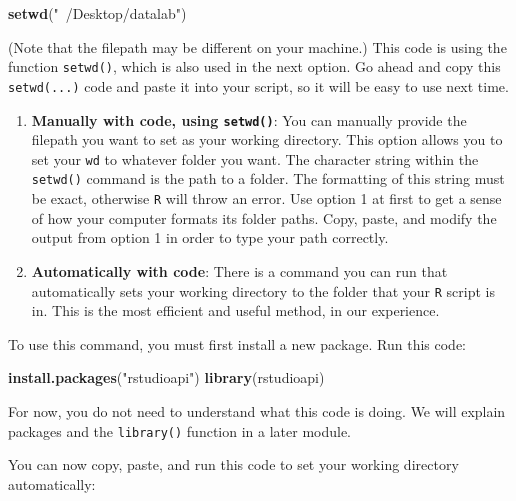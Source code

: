 \documentclass[
]{book}
\newenvironment{Shaded}{\begin{snugshade}}{\end{snugshade}}
\newcommand{\KeywordTok}[1]{\textcolor[rgb]{0.13,0.29,0.53}{\textbf{#1}}}
\newcommand{\NormalTok}[1]{#1}
\newcommand{\OperatorTok}[1]{\textcolor[rgb]{0.81,0.36,0.00}{\textbf{#1}}}
\newcommand{\StringTok}[1]{\textcolor[rgb]{0.31,0.60,0.02}{#1}}
\begin{document}
\begin{Shaded}
\begin{Highlighting}[]
\KeywordTok{setwd}\NormalTok{(}\StringTok{"~/Desktop/datalab"}\NormalTok{)}
\end{Highlighting}
\end{Shaded}

(Note that the filepath may be different on your machine.) This code is using the function \texttt{setwd()}, which is also used in the next option. Go ahead and copy this \texttt{setwd(...)} code and paste it into your script, so it will be easy to use next time.

\begin{enumerate}
\def\labelenumi{\arabic{enumi}.}
\setcounter{enumi}{1}
\item
  \textbf{Manually with code, using \texttt{setwd()}}: You can manually provide the filepath you want to set as your working directory. This option allows you to set your \texttt{wd} to whatever folder you want. The character string within the \texttt{setwd()} command is the path to a folder. The formatting of this string must be exact, otherwise \texttt{R} will throw an error. Use option 1 at first to get a sense of how your computer formats its folder paths. Copy, paste, and modify the output from option 1 in order to type your path correctly.
\item
  \textbf{Automatically with code}: There is a command you can run that automatically sets your working directory to the folder that your \texttt{R} script is in. This is the most efficient and useful method, in our experience.
\end{enumerate}

To use this command, you must first install a new package. Run this code:

\begin{Shaded}
\begin{Highlighting}[]
\KeywordTok{install.packages}\NormalTok{(}\StringTok{"rstudioapi"}\NormalTok{)}
\KeywordTok{library}\NormalTok{(rstudioapi)}
\end{Highlighting}
\end{Shaded}

For now, you do not need to understand what this code is doing. We will explain packages and the \texttt{library()} function in a later module.

You can now copy, paste, and run this code to set your working directory automatically:

\begin{Shaded}
\end{Shaded}
\end{document}
